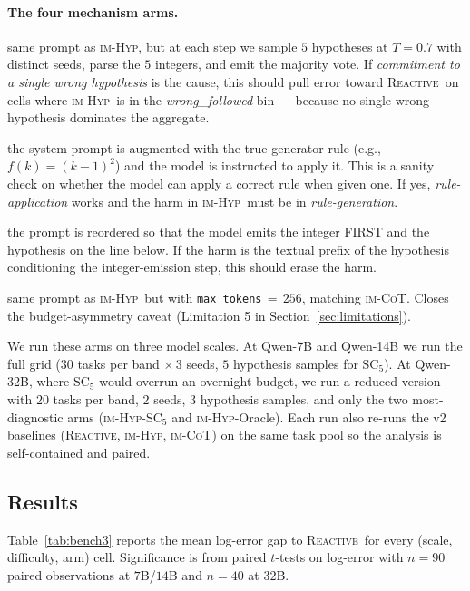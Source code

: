 \documentclass[11pt]{article}
\newcommand{\imhyp}{\textsc{im-Hyp}}
\newcommand{\imcot}{\textsc{im-CoT}}
\newcommand{\reactive}{\textsc{Reactive}}
\begin{document}
\paragraph{The four mechanism arms.}
\begin{description}[leftmargin=1.5em,itemsep=2pt,topsep=2pt]
\item[\imhyp{}-SC$_5$:] same prompt as \imhyp, but at each step we
  sample $5$ hypotheses at $T=0.7$ with distinct seeds, parse the
  $5$ integers, and emit the majority vote.  If
  \emph{commitment to a single wrong hypothesis} is the cause, this
  should pull error toward \reactive\ on cells where \imhyp\ is in
  the \textit{wrong\_followed} bin --- because no single wrong
  hypothesis dominates the aggregate.
\item[\imhyp{}-Oracle:] the system prompt is augmented with the
  true generator rule (e.g., $f(k) = (k-1)^2$) and the model is
  instructed to apply it.  This is a sanity check on whether the
  model can apply a correct rule when given one.  If yes,
  \emph{rule-application} works and the harm in \imhyp\ must be in
  \emph{rule-generation}.
\item[\imhyp{}-First:] the prompt is reordered so that the model
  emits the integer FIRST and the hypothesis on the line below.
  If the harm is the textual prefix of the hypothesis conditioning
  the integer-emission step, this should erase the harm.
\item[\imhyp{}-EqBudget:] same prompt as \imhyp\ but with
  \texttt{max\_tokens}\,$=$\,$256$, matching \imcot.  Closes the
  budget-asymmetry caveat (Limitation 5 in Section~\ref{sec:limitations}).
\end{description}

We run these arms on three model scales.  At Qwen-7B and Qwen-14B
we run the full grid ($30$ tasks per band $\times\,3$ seeds, $5$
hypothesis samples for SC$_5$).  At Qwen-32B, where SC$_5$ would
overrun an overnight budget, we run a reduced version with $20$
tasks per band, $2$ seeds, $3$ hypothesis samples, and only the
two most-diagnostic arms (\imhyp{}-SC$_5$ and \imhyp{}-Oracle).
Each run also re-runs the v2 baselines (\reactive, \imhyp,
\imcot) on the same task pool so the analysis is self-contained
and paired.

\subsection{Results}

Table~\ref{tab:bench3} reports the mean log-error gap to
\reactive\ for every (scale, difficulty, arm) cell.  Significance
is from paired $t$-tests on log-error with $n = 90$ paired
observations at $7$B/$14$B and $n = 40$ at $32$B.
\end{document}
